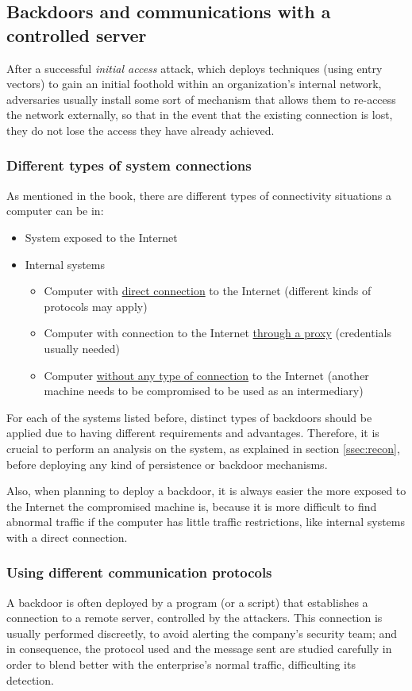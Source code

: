 \subsection{Backdoors and communications with a controlled server}
\label{ssec:backComm}
After a successful \textit{initial access} attack, which deploys techniques (using entry vectors) to gain an initial foothold within an organization's internal network, adversaries usually install some sort of mechanism that allows them to re-access the network externally, so that in the event that the existing connection is lost, they do not lose the access they have already achieved.

\subsubsection{Different types of system connections}
\label{ssec:persistenceTypes}
As mentioned in the book\cite{RTBook}, there are different types of connectivity situations a computer can be in:
\begin{itemize}
\item System exposed to the Internet
\item Internal systems
\begin{itemize}
\item Computer with \underline{direct connection} to the Internet (different kinds of protocols may apply)
\item Computer with connection to the Internet \underline{through a proxy} (credentials usually needed)
\item Computer \underline{without any type of connection} to the Internet (another machine needs to be compromised to be used as an intermediary)
\end{itemize}
\end{itemize}

For each of the systems listed before, distinct types of backdoors should be applied due to having different requirements and advantages. Therefore, it is crucial to perform an analysis on the system, as explained in section \ref{ssec:recon}, before deploying any kind of persistence or backdoor mechanisms. 

Also, when planning to deploy a backdoor, it is always easier the more exposed to the Internet the compromised machine is, because it is more difficult to find abnormal traffic if the computer has little traffic restrictions, like internal systems with a direct connection.

\subsubsection{Using different communication protocols}
\label{sssec:backProt}
A backdoor is often deployed by a program (or a script) that establishes a connection to a remote server, controlled by the attackers. This connection is usually performed discreetly, to avoid alerting the company's security team; and in consequence, the protocol used and the message sent are studied carefully in order to blend better with the enterprise's normal traffic, difficulting its detection.

